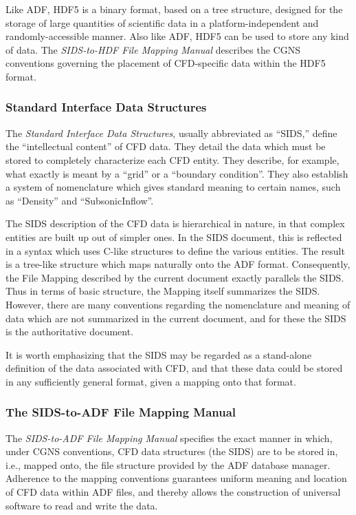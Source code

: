 Like ADF, HDF5 is a binary format, based on a tree structure,
designed for the storage of large quantities of scientific data in a
platform-independent and randomly-accessible manner.
Also like ADF, HDF5 can be used to store any kind of data.
The \textit{SIDS-to-HDF File Mapping Manual} describes the CGNS
conventions governing the placement of CFD-specific data within the HDF5
format.

\subsubsection{Standard Interface Data Structures}

The \textit{Standard Interface Data Structures}, usually abbreviated as
``SIDS,'' define the ``intellectual content'' of CFD data.
They detail the data which must be stored to completely characterize
each CFD entity. They describe, for example, what exactly is meant by a
``grid'' or a ``boundary condition''.
They also establish a system of nomenclature which gives standard
meaning to certain names, such as ``Density'' and ``SubsonicInflow''.

The SIDS description of the CFD data is hierarchical in nature, in that
complex entities are built up out of simpler ones. In the SIDS document,
this is reflected in a syntax which uses C-like structures to define
the various entities. The result is a tree-like structure which maps
naturally onto the ADF format. Consequently, the File Mapping described
by the current document exactly parallels the SIDS. Thus in terms of
basic structure, the Mapping itself summarizes the SIDS. However, there
are many conventions regarding the nomenclature and meaning of data
which are not summarized in the current document, and for these the SIDS
is the authoritative document.

It is worth emphasizing that the SIDS may be regarded as a stand-alone
definition of the data associated with CFD, and that these data could
be stored in any sufficiently general format, given a mapping onto that
format.

\subsubsection{The SIDS-to-ADF File Mapping Manual}

The \textit{SIDS-to-ADF File Mapping Manual} specifies the exact manner
in which, under CGNS conventions, CFD data structures (the SIDS) are
to be stored in, i.e., mapped onto, the file structure provided by the
ADF database manager.
Adherence to the mapping conventions guarantees uniform meaning
and location of CFD data within ADF files, and thereby allows the
construction of universal software to read and write the data.

